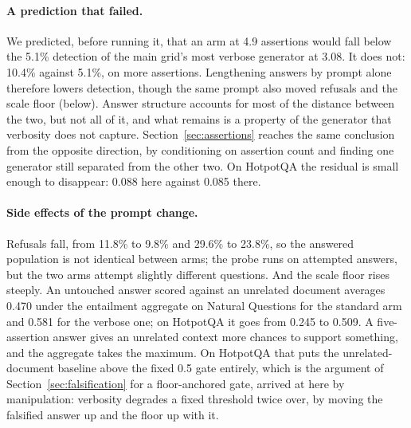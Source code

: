 \documentclass[11pt]{article}
\begin{document}
\paragraph{A prediction that failed.} We predicted, before running it, that an arm at 4.9 assertions would fall below the 5.1\% detection of the main grid's most verbose generator at 3.08. It does not: 10.4\% against 5.1\%, on more assertions. Lengthening answers by prompt alone therefore lowers detection, though the same prompt also moved refusals and the scale floor (below). Answer structure accounts for most of the distance between the two, but not all of it, and what remains is a property of the generator that verbosity does not capture. Section~\ref{sec:assertions} reaches the same conclusion from the opposite direction, by conditioning on assertion count and finding one generator still separated from the other two. On HotpotQA the residual is small enough to disappear: 0.088 here against 0.085 there.

\paragraph{Side effects of the prompt change.} Refusals fall, from 11.8\% to 9.8\% and 29.6\% to 23.8\%, so the answered population is not identical between arms; the probe runs on attempted answers, but the two arms attempt slightly different questions. And the scale floor rises steeply. An untouched answer scored against an unrelated document averages 0.470 under the entailment aggregate on Natural Questions for the standard arm and 0.581 for the verbose one; on HotpotQA it goes from 0.245 to 0.509. A five-assertion answer gives an unrelated context more chances to support something, and the aggregate takes the maximum. On HotpotQA that puts the unrelated-document baseline above the fixed 0.5 gate entirely, which is the argument of Section~\ref{sec:falsification} for a floor-anchored gate, arrived at here by manipulation: verbosity degrades a fixed threshold twice over, by moving the falsified answer up and the floor up with it.
\end{document}
